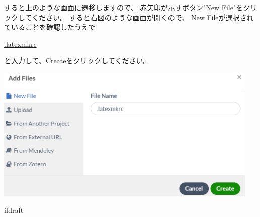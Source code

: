 		\noindent
		\begin{minipage}{0.4\hsize}%
			すると上のような画面に遷移しますので、
			赤矢印が示すボタン"New File"をクリックしてください。
			すると右図のような画面が開くので、
			New Fileが選択されていることを確認したうえで
			\begin{mdframed}[style=shadow]
				\url{.latexmkrc}
			\end{mdframed}\vspace{-3mm}
			と入力して、Createをクリックしてください。
		\end{minipage}\hfill
		\begin{minipage}{0.6\hsize}
			\begin{flushright}
				\includegraphics[width=0.95\textwidth]{overleaf-editer-newfile.png}		
			\end{flushright}
		\end{minipage}

		


\expandafter\ifx\csname ifdraft\endcsname\relax
	
\fi